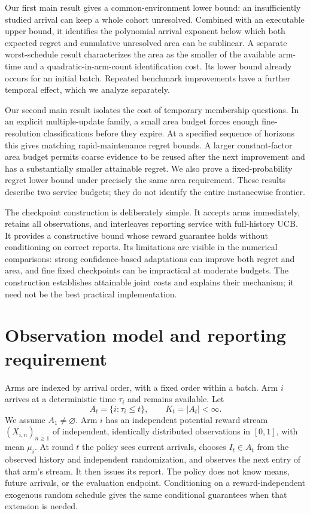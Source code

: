 \documentclass[11pt]{article}
\begin{document}
Our first main result gives a common-environment lower bound: an insufficiently
studied arrival can keep a whole cohort unresolved. Combined with an executable
upper bound, it identifies the polynomial arrival exponent below which both
expected regret and cumulative unresolved area can be sublinear. A separate
worst-schedule result characterizes the area as the smaller of the available
arm-time and a quadratic-in-arm-count identification cost. Its lower bound
already occurs for an initial batch. Repeated benchmark improvements have a
further temporal effect, which we analyze separately.

Our second main result isolates the cost of temporary membership questions.
In an explicit multiple-update family, a small area budget forces enough
fine-resolution classifications before they expire. At a specified sequence
of horizons this gives matching rapid-maintenance regret bounds. A larger
constant-factor area budget permits coarse evidence to be reused after the
next improvement and has a substantially smaller attainable regret. We also
prove a fixed-probability regret lower bound under precisely the same area
requirement. These results describe two service budgets; they do not identify
the entire instancewise frontier.

The checkpoint construction is deliberately simple. It accepts arms immediately,
retains all observations, and interleaves reporting service with full-history
UCB. It provides a constructive bound whose reward guarantee holds without
conditioning on correct reports. Its limitations are visible in the numerical
comparisons: strong confidence-based adaptations can improve both regret and
area, and fine fixed checkpoints can be impractical at moderate budgets.
The construction establishes attainable joint costs and explains their
mechanism; it need not be the best practical implementation.
\section{Observation model and reporting requirement}
\label{sec:model}

Arms are indexed by arrival order, with a fixed order within a batch. Arm $i$
arrives at a deterministic time $\tau_i$ and remains available. Let
\[
 A_t=\{i:\tau_i\le t\},\qquad K_t=|A_t|<\infty.
\]
We assume $A_1\ne\varnothing$. Arm $i$ has an independent potential reward
stream $(X_{i,n})_{n\ge1}$ of independent, identically distributed observations
in $[0,1]$, with mean $\mu_i$. At round $t$ the policy sees current arrivals,
chooses $I_t\in A_t$ from the observed history and independent randomization,
and observes the next entry of that arm's stream. It then issues its report.
The policy does not know means, future arrivals, or the evaluation endpoint.
Conditioning on a reward-independent exogenous random schedule gives the same
conditional guarantees when that extension is needed.
\end{document}
